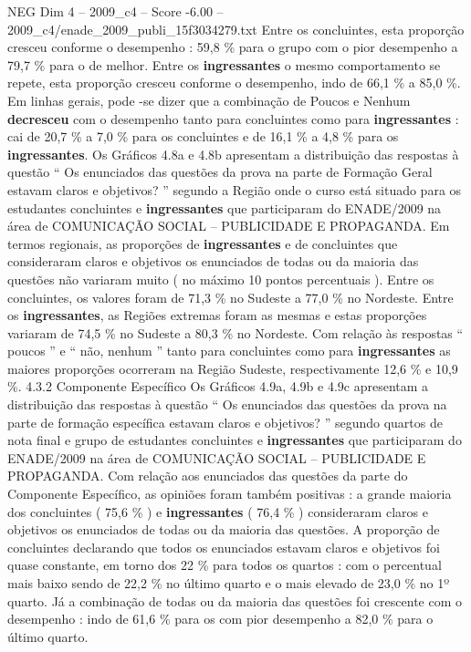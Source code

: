 \begin{textsample}{NEG Dim 4 – 2009\_c4 – Score -6.00 – 2009\_c4/enade\_2009\_publi\_15f3034279.txt}
Entre os concluintes, esta proporção cresceu conforme o desempenho : 59,8 \% para o grupo com o pior desempenho a 79,7 \% para o de melhor.
Entre os \textbf{ingressantes} o mesmo comportamento se repete, esta proporção cresceu conforme o desempenho, indo de 66,1 \% a 85,0 \%.
Em linhas gerais, pode -se dizer que a combinação de Poucos e Nenhum \textbf{decresceu} com o desempenho tanto para concluintes como para \textbf{ingressantes} : cai de 20,7 \% a 7,0 \% para os concluintes e de 16,1 \% a 4,8 \% para os \textbf{ingressantes}.
Os Gráficos 4.8a e 4.8b apresentam a distribuição das respostas à questão “ Os enunciados das questões da prova na parte de Formação Geral estavam claros e objetivos? ” segundo a Região onde o curso está situado para os estudantes concluintes e \textbf{ingressantes} que participaram do ENADE/2009 na área de COMUNICAÇÃO SOCIAL – PUBLICIDADE E PROPAGANDA.
Em termos regionais, as proporções de \textbf{ingressantes} e de concluintes que consideraram claros e objetivos os enunciados de todas ou da maioria das questões não variaram muito ( no máximo 10 pontos percentuais ).
Entre os concluintes, os valores foram de 71,3 \% no Sudeste a 77,0 \% no Nordeste.
Entre os \textbf{ingressantes}, as Regiões extremas foram as mesmas e estas proporções variaram de 74,5 \% no Sudeste a 80,3 \% no Nordeste.
Com relação às respostas “ poucos ” e “ não, nenhum ” tanto para concluintes como para \textbf{ingressantes} as maiores proporções ocorreram na Região Sudeste, respectivamente 12,6 \% e 10,9 \%. 4.3.2 Componente Específico Os Gráficos 4.9a, 4.9b e 4.9c apresentam a distribuição das respostas à questão “ Os enunciados das questões da prova na parte de formação específica estavam claros e objetivos? ” segundo quartos de nota final e grupo de estudantes concluintes e \textbf{ingressantes} que participaram do ENADE/2009 na área de COMUNICAÇÃO SOCIAL – PUBLICIDADE E PROPAGANDA.
Com relação aos enunciados das questões da parte do Componente Específico, as opiniões foram também positivas : a grande maioria dos concluintes ( 75,6 \% ) e \textbf{ingressantes} ( 76,4 \% ) consideraram claros e objetivos os enunciados de todas ou da maioria das questões.
A proporção de concluintes declarando que todos os enunciados estavam claros e objetivos foi quase constante, em torno dos 22 \% para todos os quartos : com o percentual mais baixo sendo de 22,2 \% no último quarto e o mais elevado de 23,0 \% no 1º quarto.
Já a combinação de todas ou da maioria das questões foi crescente com o desempenho : indo de 61,6 \% para os com pior desempenho a 82,0 \% para o último quarto.

\end{textsample}
